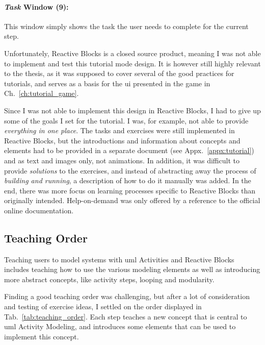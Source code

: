 \paragraph{\emph{Task} Window (9):} This window simply shows the task the user needs to complete for the current step.

\noindent
Unfortunately, Reactive Blocks is a closed source product, meaning I was not able to implement and test this tutorial mode design. It is however still highly relevant to the thesis, as it was supposed to cover several of the good practices for tutorials, and serves as a basis for the \gls{ui} presented in the game in Ch.~\ref{ch:tutorial_game}.

\noindent
Since I was not able to implement this design in Reactive Blocks, I had to give up some of the goals I set for the tutorial. I was, for example, not able to provide \emph{everything in one place}. The tasks and exercises were still implemented in Reactive Blocks, but the introductions and information about concepts and elements had to be provided in a separate document (see Appx.~\ref{appx:tutorial}) and as text and images only, not animations. In addition, it was difficult to provide \emph{solutions} to the exercises, and instead of abstracting away the process of \emph{building and running}, a description of how to do it manually was added. In the end, there was more focus on learning processes specific to Reactive Blocks than originally intended. Help-on-demand was only offered by a reference to the official online documentation.

\subsection{Teaching Order}
\label{sec:teaching_order}
Teaching users to model systems with \gls{uml} Activities and Reactive Blocks includes teaching how to use the various modeling elements as well as introducing more abstract concepts, like activity steps, looping and modularity.

\noindent
Finding a good teaching order was challenging, but after a lot of consideration and testing of exercise ideas, I settled on the order displayed in Tab.~\ref{tab:teaching_order}. Each step teaches a new concept that is central to \gls{uml} Activity Modeling, and introduces some elements that can be used to implement this concept.

